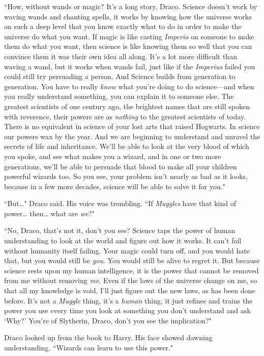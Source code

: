 ``How, without wands or magic? It's a long story, Draco. Science doesn't work by waving wands and chanting spells, it works by knowing how the universe works on such a deep level that you know exactly what to do in order to make the universe do what you want. If magic is like casting \emph{Imperio} on someone to make them do what you want, then science is like knowing them so well that you can convince them it was their own idea all along. It's a lot more difficult than waving a wand, but it works when wands fail, just like if the \emph{Imperius} failed you could still try persuading a person. And Science builds from generation to generation. You have to really \emph{know} what you're doing to do science—and when you really understand something, you can explain it to someone else. The greatest scientists of one century ago, the brightest names that are still spoken with reverence, their powers are as \emph{nothing} to the greatest scientists of today. There is no equivalent in science of your lost arts that raised Hogwarts. In science our powers wax by the year. And we are beginning to understand and unravel the secrets of life and inheritance. We'll be able to look at the very blood of which you spoke, and see what makes you a wizard, and in one or two more generations, we'll be able to persuade that blood to make all your children powerful wizards too. So you see, your problem isn't nearly as bad as it looks, because in a few more decades, science will be able to solve it for you."

``But{\ldots}" Draco said. His voice was trembling. ``If \emph{Muggles} have that kind of power{\ldots} then{\ldots} what are \emph{we}?"

``No, Draco, that's not it, don't you see? Science taps the power of human understanding to look at the world and figure out how it works. It can't fail without humanity itself failing. Your magic could turn off, and you would hate that, but you would still be \emph{you}. You would still be alive to regret it. But because science rests upon my human intelligence, it is the power that cannot be removed from me without removing \emph{me}. Even if the laws of the universe change on me, so that all my knowledge is void, I'll just figure out the new laws, as has been done before. It's not a \emph{Muggle} thing, it's a \emph{human} thing, it just refines and trains the power you use every time you look at something you don't understand and ask `Why?' You're of Slytherin, Draco, don't you see the implication?"

Draco looked up from the book to Harry. His face showed dawning understanding. ``Wizards can learn to use this power."

